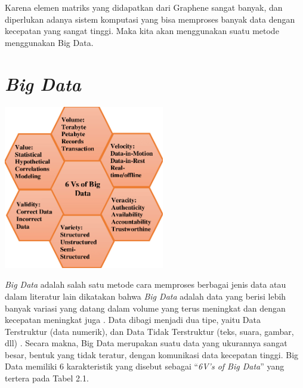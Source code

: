 \documentclass[12pt,a4paper]{report}
\begin{document}
	Karena elemen matriks yang didapatkan dari Graphene sangat banyak, dan diperlukan adanya sistem komputasi yang bisa memproses banyak data dengan kecepatan yang sangat tinggi. Maka kita akan menggunakan suatu metode menggunakan Big Data.
	
	\section{\textit{Big Data}}
	
	\begin{center}
		\includegraphics[width=7cm]{gambar/bigdat.png}
	\end{center}

	\textit{Big Data} adalah salah satu metode cara memproses berbagai jenis data atau dalam literatur lain dikatakan bahwa \textit{Big Data} adalah data yang berisi lebih banyak variasi yang datang dalam volume yang terus meningkat dan dengan kecepatan meningkat juga \cite{Oracle2020}. Data dibagi menjadi dua tipe, yaitu Data Terstruktur (data numerik), dan Data Tidak Terstruktur (teks, suara, gambar, dll) \cite{Shakhovska2019}. Secara makna, Big Data merupakan suatu data yang ukurannya sangat besar, bentuk yang tidak teratur, dengan komunikasi data kecepatan tinggi. Big Data memiliki 6 karakteristik yang disebut sebagai “\textit{6V’s of Big Data}” yang tertera pada Tabel 2.1.
	
\end{document}
